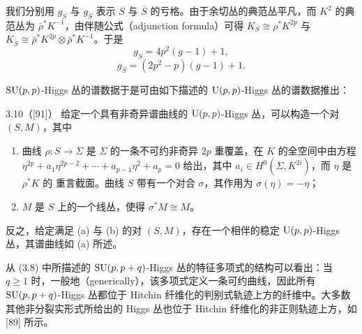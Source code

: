 
我们分别用 $g_S$ 与 $g_{\bar S}$ 表示 $S$ 与 $\bar S$ 的亏格。由于余切丛的典范丛平凡，而 $K^2$ 的典范丛为 $\bar\rho^*K^{-1}$，由伴随公式（adjunction formula）可得 $K_S\cong\rho^*K^{2p}$ 与 $K_{\bar S}\cong\bar\rho^*K^{2p}\otimes\bar\rho^*K^{-1}$。于是
\[
g_S=4p^2(g-1)+1,
\]
\[
g_{\bar S}=(2p^2-p)(g-1)+1.
\]


$\mathrm{SU}(p,p)$-Higgs 丛的谱数据于是可由如下描述的 $\mathrm{U}(p,p)$-Higgs 丛的谱数据推出：

\begin{thm}{3.10（[91]）}
给定一个具有非奇异谱曲线的 $\mathrm{U}(p,p)$-Higgs 丛，可以构造一个对 $(S,M)$，其中
\begin{enumerate}[label=(\alph*),leftmargin=2.2em]
\item 曲线 $\rho:S\to\Sigma$ 是 $\Sigma$ 的一条不可约非奇异 $2p$ 重覆盖，在 $K$ 的全空间中由方程 $\eta^{2p}+a_1\eta^{2p-2}+\cdots+a_{p-1}\eta^2+a_p=0$ 给出，其中 $a_i\in H^0(\Sigma,K^{2i})$，而 $\eta$ 是 $\rho^*K$ 的 重言截面。曲线 $S$ 带有一个对合 $\sigma$，其作用为 $\sigma(\eta)=-\eta$；
\item $M$ 是 $S$ 上的一个线丛，使得 $\sigma^*M\cong M$。
\end{enumerate}
反之，给定满足 (a) 与 (b) 的对 $(S,M)$，存在一个相伴的稳定 $\mathrm{U}(p,p)$-Higgs 丛，其谱曲线如 (a) 所述。
\end{thm}


从 (3.8) 中所描述的 $\mathrm{SU}(p,p+q)$-Higgs 丛的特征多项式的结构可以看出：当 $q\ge 1$ 时，一般地（generically），该多项式定义一条可约曲线，因此所有 $\mathrm{SU}(p,p+q)$-Higgs 丛都位于 Hitchin 纤维化的判别式轨迹上方的纤维中。大多数其他非分裂实形式所给出的 Higgs 丛也位于 Hitchin 纤维化的非正则轨迹上方，如 [89] 所示。

